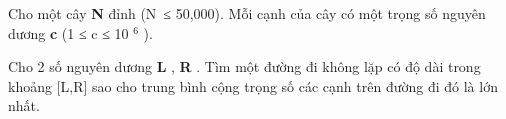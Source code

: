 Cho một cây   \textbf{    N   }   đỉnh (N ≤ 50,000). Mỗi cạnh của cây có một trọng số nguyên dương   \textbf{    c   }   (1 ≤ c ≤ 10   $^    6   $   ).  

   Cho 2 số nguyên dương   \textbf{    L   }   ,   \textbf{    R   }   . Tìm một đường đi không lặp có độ dài trong khoảng [L,R] sao cho trung bình cộng trọng số các cạnh trên đường đi đó là lớn nhất.